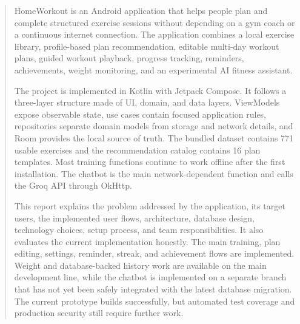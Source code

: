 \begin{abstract}
HomeWorkout is an Android application that helps people plan and complete structured exercise sessions without depending on a gym coach or a continuous internet connection. The application combines a local exercise library, profile-based plan recommendation, editable multi-day workout plans, guided workout playback, progress tracking, reminders, achievements, weight monitoring, and an experimental AI fitness assistant.

The project is implemented in Kotlin with Jetpack Compose. It follows a three-layer structure made of UI, domain, and data layers. ViewModels expose observable state, use cases contain focused application rules, repositories separate domain models from storage and network details, and Room provides the local source of truth. The bundled dataset contains 771 usable exercises and the recommendation catalog contains 16 plan templates. Most training functions continue to work offline after the first installation. The chatbot is the main network-dependent function and calls the Groq API through OkHttp.

This report explains the problem addressed by the application, its target users, the implemented user flows, architecture, database design, technology choices, setup process, and team responsibilities. It also evaluates the current implementation honestly. The main training, plan editing, settings, reminder, streak, and achievement flows are implemented. Weight and database-backed history work are available on the main development line, while the chatbot is implemented on a separate branch that has not yet been safely integrated with the latest database migration. The current prototype builds successfully, but automated test coverage and production security still require further work.
\end{abstract}
